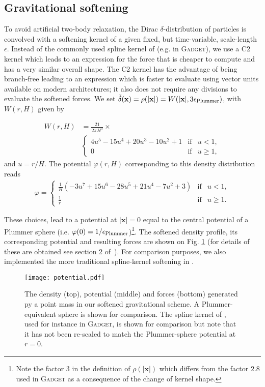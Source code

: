 \subsection{Gravitational softening}
\label{ssec:potential_softening}

To avoid artificial two-body relaxation, the Dirac
$\delta$-distribution of particles is convolved with a softening
kernel of a given fixed, but time-variable, scale-length
$\epsilon$. Instead of the commonly used spline kernel of
\cite{Monaghan1985} (e.g. in \textsc{Gadget}), we use a C2 kernel
\citep{Wendland1995} which leads to an expression for the force that
is cheaper to compute and has a very similar overall shape. The C2
kernel has the advantage of being branch-free leading to an expression
which is faster to evaluate using vector units available on modern
architectures; it also does not require any divisions to evaluate the
softened forces. We set
$\tilde\delta(\mathbf{x}) = \rho(|\mathbf{x}|) = W(|\mathbf{x}|,
3\epsilon_{\rm Plummer})$, with $W(r, H)$ given by

\begin{align}
W(r,H) &= \frac{21}{2\pi H^3} \times \nonumber \\
&\left\lbrace\begin{array}{rcl}
4u^5 - 15u^4 + 20u^3 - 10u^2 + 1 & \mbox{if} & u < 1,\\
0 & \mbox{if} & u \geq 1,
\end{array}
\right.
\end{align}
and $u = r/H$. The potential $\varphi(r,H)$ corresponding to this density distribution reads
\begin{align}
\varphi = 
\left\lbrace\begin{array}{rcl}
\frac{1}{H} (-3u^7 + 15u^6 - 28u^5 + 21u^4 - 7u^2 + 3) & \mbox{if} & u < 1,\\
\frac{1}{r} & \mbox{if} & u \geq 1.
\end{array}
\right.
\label{eq:fmm:potential}
\end{align}

These choices, lead to a potential at $|\mathbf{x}| = 0$ equal to the
central potential of a Plummer sphere (i.e.
$\varphi(0) = 1/\epsilon_{\rm Plummer}$)\footnote{Note the factor $3$
  in the definition of $\rho(|\mathbf{x}|)$ which differs from the
  factor $2.8$ used in \textsc{Gadget} as a consequence of the change
  of kernel shape.}. The softened density profile, its corresponding
potential and resulting forces are shown on
Fig. \ref{fig:fmm:softening} (for details of these are obtained see
section 2 of~\cite{Price2007}). For comparison purposes, we also
implemented the more traditional spline-kernel softening in \swift.


\begin{figure}
\texttt{[image: potential.pdf]}
\caption{The density (top), potential (middle) and forces (bottom)
  generated py a point mass in our softened gravitational scheme.  A
  Plummer-equivalent sphere is shown for comparison. The spline kernel
  of \citet{Monaghan1985}, used for instance in \textsc{Gadget}, is
  shown for comparison but note that it has not been re-scaled to
  match the Plummer-sphere potential at $r=0$.  }
\label{fig:fmm:softening}
\end{figure}
